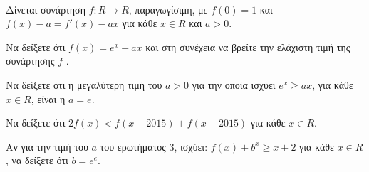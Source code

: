 \documentclass[ektypwsh]{diag-pan-xelatex}
\begin{document}
\begin{thema}
\item \mbox{}\\\vspace{-5mm}
\begin{erwthma}
\item 
{}
\end{erwthma}
\item 
\item Δίνεται συνάρτηση $ f:R \to R $, παραγωγίσιμη, με $ f(0)=1 $ και $ f(x)-a=f'(x)-ax $ για κάθε $ x\in R $ και $ a>0 $.
\begin{erwthma}
\item Να δείξετε ότι $ f(x)=e^x-ax $ και στη συνέχεια να βρείτε την ελάχιστη τιμή της συνάρτησης $ f $ .
\item Να δείξετε ότι η μεγαλύτερη τιμή του $ a>0 $ για την οποία ισχύει $ e^x \geq ax $, για κάθε $ x \in R $, είναι η $ a=e $.
\item Να δείξετε ότι $ 2f(x)<f(x+2015)+f(x-2015) $ για κάθε $ x \in R $.
\item Αν για την τιμή του $ a $ του ερωτήματος 3, ισχύει: $ f(x)+b^x \geq x+2 $
για κάθε $ x \in R $, να δείξετε ότι $ \displaystyle{b=e^e} $.
\end{erwthma}

\item 
\end{thema}
\end{document}

